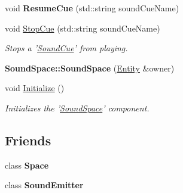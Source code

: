 \begin{DoxyCompactItemize}
\item 
\hypertarget{classDCEngine_1_1Components_1_1SoundSpace_a3bef464fdecace6312430313aabb16bb}{void {\bfseries Resume\-Cue} (std\-::string sound\-Cue\-Name)}\label{classDCEngine_1_1Components_1_1SoundSpace_a3bef464fdecace6312430313aabb16bb}

\item 
void \hyperlink{classDCEngine_1_1Components_1_1SoundSpace_a6f5b7e6abbb5cf133e13203c86deceff}{Stop\-Cue} (std\-::string sound\-Cue\-Name)
\begin{DoxyCompactList}\small\item\em Stops a '\hyperlink{classDCEngine_1_1SoundCue}{Sound\-Cue}' from playing. \end{DoxyCompactList}\item 
\hypertarget{classDCEngine_1_1Components_1_1SoundSpace_aa13d13aecd07b0c899fe87863712edba}{{\bfseries Sound\-Space\-::\-Sound\-Space} (\hyperlink{classDCEngine_1_1Entity}{Entity} \&owner)}\label{classDCEngine_1_1Components_1_1SoundSpace_aa13d13aecd07b0c899fe87863712edba}

\item 
\hypertarget{classDCEngine_1_1Components_1_1SoundSpace_a48cb629f7167456014c886ea8059d1a5}{void \hyperlink{classDCEngine_1_1Components_1_1SoundSpace_a48cb629f7167456014c886ea8059d1a5}{Initialize} ()}\label{classDCEngine_1_1Components_1_1SoundSpace_a48cb629f7167456014c886ea8059d1a5}

\begin{DoxyCompactList}\small\item\em Initializes the '\hyperlink{classDCEngine_1_1Components_1_1SoundSpace}{Sound\-Space}' component. \end{DoxyCompactList}\end{DoxyCompactItemize}
\subsection*{Friends}
\begin{DoxyCompactItemize}
\item 
\hypertarget{classDCEngine_1_1Components_1_1SoundSpace_a2129e6c0ac73536a2ac4f681dae16947}{class {\bfseries Space}}\label{classDCEngine_1_1Components_1_1SoundSpace_a2129e6c0ac73536a2ac4f681dae16947}

\item 
\hypertarget{classDCEngine_1_1Components_1_1SoundSpace_abf63387d5caa056b5f6e0b2e010565f6}{class {\bfseries Sound\-Emitter}}\label{classDCEngine_1_1Components_1_1SoundSpace_abf63387d5caa056b5f6e0b2e010565f6}

\end{DoxyCompactItemize}

